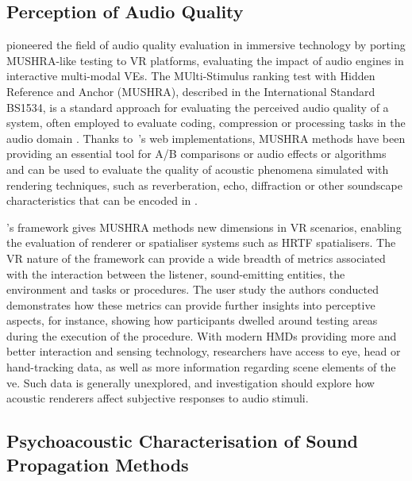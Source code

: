 \subsection{Perception of Audio Quality}
\cite{rummukainen2018audio} pioneered the field of audio quality evaluation in immersive technology by porting MUSHRA-like testing to VR platforms, evaluating the impact of audio engines in interactive multi-modal VEs. The MUlti-Stimulus ranking test with Hidden Reference and Anchor (MUSHRA), described in the International Standard BS1534\citep{liebetrau2014revision}, is a standard approach for evaluating the perceived audio quality of a system, often employed to evaluate coding, compression or processing tasks in the audio domain \citep{series2014method}. Thanks to~\cite{waet2015}'s web implementations, MUSHRA methods have been providing an essential tool for A/B comparisons or audio effects or algorithms and can be used to evaluate the quality of acoustic phenomena simulated with rendering techniques, such as reverberation, echo, diffraction or other soundscape characteristics that can be encoded in .\par
\cite{rummukainen2018audio}'s framework gives MUSHRA methods new dimensions in VR scenarios, enabling the evaluation of renderer or spatialiser systems such as HRTF spatialisers. The VR nature of the framework can provide a wide breadth of metrics associated with the interaction between the listener, sound-emitting entities, the environment and tasks or procedures. The user study the authors conducted demonstrates how these metrics can provide further insights into perceptive aspects, for instance, showing how participants dwelled around testing areas during the execution of the procedure. With modern HMDs providing more and better interaction and sensing technology, researchers have access to eye, head or hand-tracking data, as well as more information regarding scene elements of the \acrshort{ve}. Such data is generally unexplored, and investigation should explore how acoustic renderers affect subjective responses to audio stimuli.\par

\subsection{Psychoacoustic Characterisation of Sound Propagation Methods}

\cite{gonzalez2023binaural}

